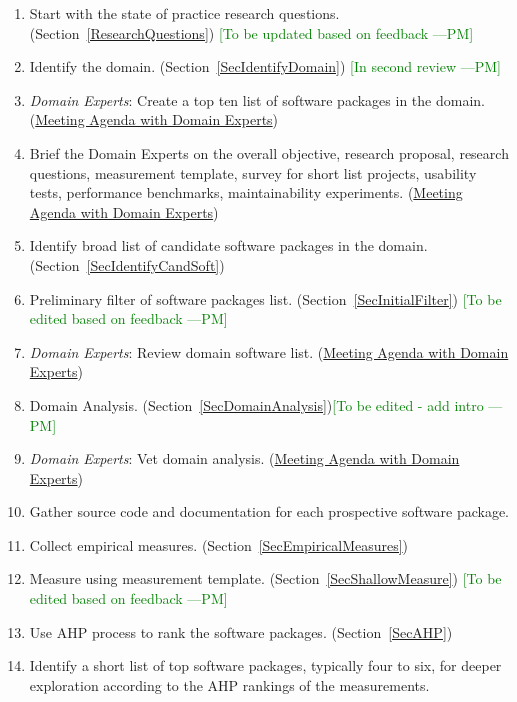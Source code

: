 \documentclass[letterpaper,cleveref]{lipics-v2019}
\newcommand{\authornote}[3]{\textcolor{#1}{[#3 ---#2]}}
\newcommand{\authornote}[3]{}
\newcommand{\pmi}[1]{\authornote{green}{PM}{#1}} %
\theoremstyle{definition}
\begin{document}
\begin{enumerate}
\item Start with the state of practice research questions. (Section~\ref{ResearchQuestions}) \pmi{To be updated based on feedback}
\item Identify the domain. (Section~\ref{SecIdentifyDomain}) \pmi{In second review}
\item \emph{Domain Experts}: Create a top ten list of software packages in the domain. (\href{https://github.com/smiths/AIMSS/blob/master/StateOfPractice/Methodology/Meeting Agenda withmDomainmExperts.pdf}{Meeting Agenda with Domain Experts})
\item Brief the Domain Experts on the overall objective, research proposal, research questions, measurement template, survey for short list projects, usability tests, performance benchmarks, maintainability experiments. (\href{https://github.com/smiths/AIMSS/blob/master/StateOfPractice/Methodology/Meeting Agenda withmDomainmExperts.pdf}{Meeting Agenda with Domain Experts})
\item Identify broad list of candidate software packages in the domain. (Section~\ref{SecIdentifyCandSoft})
\item Preliminary filter of software packages list. (Section~\ref{SecInitialFilter}) \pmi{To be edited based on feedback}
\item \emph{Domain Experts}: Review domain software list. (\href{https://github.com/smiths/AIMSS/blob/master/StateOfPractice/Methodology/Meeting Agenda withmDomainmExperts.pdf}{Meeting Agenda with Domain Experts})
\item Domain Analysis. (Section~\ref{SecDomainAnalysis})\pmi{To be edited - add intro}
\item \emph{Domain Experts}: Vet domain analysis. (\href{https://github.com/smiths/AIMSS/blob/master/StateOfPractice/Methodology/Meeting Agenda withmDomainmExperts.pdf}{Meeting Agenda with Domain Experts}) 
\item Gather source code and documentation for each prospective software package.
\item Collect empirical measures. (Section~\ref{SecEmpiricalMeasures})
\item Measure using measurement template. (Section~\ref{SecShallowMeasure}) \pmi{To be edited based on feedback}
\item Use AHP process to rank the software packages. (Section~\ref{SecAHP})
\item Identify a short list of top software packages, typically four to six, for deeper exploration according to the AHP rankings of the measurements.

\end{enumerate}
\end{document}
